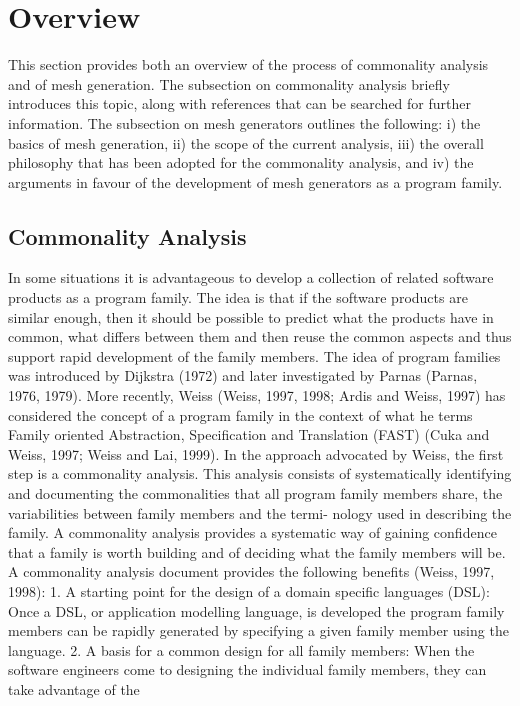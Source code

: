 \documentclass[12pt]{article}
\begin{document}
\newpage
\section{Overview}
This section provides both an overview of the process of commonality analysis and of mesh
generation. The subsection on commonality analysis briefly introduces this topic, along
with references that can be searched for further information. The subsection on mesh
generators outlines the following: i) the basics of mesh generation, ii) the scope of the
current analysis, iii) the overall philosophy that has been adopted for the commonality
analysis, and iv) the arguments in favour of the development of mesh generators as a
program family.

\subsection{Commonality Analysis}
In some situations it is advantageous to develop a collection of related software products
as a program family. The idea is that if the software products are similar enough, then
it should be possible to predict what the products have in common, what differs between
them and then reuse the common aspects and thus support rapid development of the
family members. The idea of program families was introduced by Dijkstra (1972) and later
investigated by Parnas (Parnas, 1976, 1979). More recently, Weiss (Weiss, 1997, 1998;
Ardis and Weiss, 1997) has considered the concept of a program family in the context of
what he terms Family oriented Abstraction, Specification and Translation (FAST) (Cuka
and Weiss, 1997; Weiss and Lai, 1999).
In the approach advocated by Weiss, the first step is a commonality analysis. This
analysis consists of systematically identifying and documenting the commonalities that all
program family members share, the variabilities between family members and the termi-
nology used in describing the family. A commonality analysis provides a systematic way of
gaining confidence that a family is worth building and of deciding what the family members
will be. A commonality analysis document provides the following benefits (Weiss, 1997,
1998):
1. A starting point for the design of a domain specific languages (DSL): Once a DSL,
or application modelling language, is developed the program family members can be
rapidly generated by specifying a given family member using the language.
2. A basis for a common design for all family members: When the software engineers
come to designing the individual family members, they can take advantage of the
\end{document}
